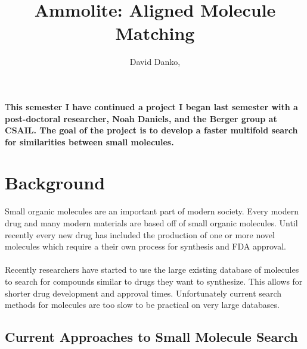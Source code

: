 \documentclass[DIV=calc, paper=a4, fontsize=12pt, twocolumn]{scrartcl}	 %
\title{Ammolite: Aligned Molecule Matching} %
\author{David Danko, } %
\date{} %
\newcommand{\initial}[1]{ %
\lettrine[lines=3,lhang=0.3,nindent=0em]{
\color{DarkGoldenrod}
{\textsf{#1}}}{}}
\begin{document}
\maketitle %

\thispagestyle{fancy} %


\initial{T}\textbf{his semester I have continued a project I began last semester with a post-doctoral researcher, Noah Daniels, and the Berger group at CSAIL. The goal of the project is to develop a faster multifold search for similarities between small molecules. }


\section*{Background}

Small organic molecules are an important part of modern society. Every modern drug and
many modern materials are based off of small organic molecules. Until recently every new drug has included the production of one or more novel molecules which require a their own process for synthesis and FDA approval.
\\\\
Recently researchers have started to use the large existing database of molecules to search for compounds similar to drugs they want to synthesize. This allows for shorter drug development and approval times. Unfortunately current search methods for molecules are too slow to be practical on very large databases. 


\subsection*{Current Approaches to Small Molecule Search}
\end{document}

